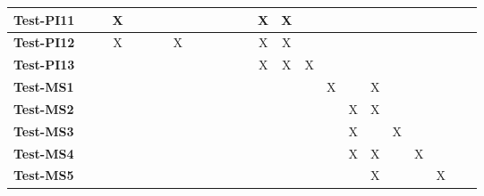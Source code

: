 \documentclass[12pt, titlepage]{article}
\begin{document}
\begin{landscape}
\begin{table}[H]
\begin{adjustwidth}{-0.1in}{-1in}
{\begin{tabular}{|c|c|c|c|c|c|c|c|c|c|c|c|c|c|c|c|c|c|c|c|c|c|c|c|}
\multicolumn{1}{|l|}{\textbf{Test-PI11}}   &             &              &X             &              &             &             &             &             &              &              &             &             &X              &X             &              &                & & & & & & &\\ \hline
\multicolumn{1}{|l|}{\textbf{Test-PI12}}   &             &              &X             &              &             &             &X             &             &              &              &             &             &X              &X             &              &                & & & & & & &\\ \hline
\multicolumn{1}{|l|}{\textbf{Test-PI13}}   &             &              &             &              &             &             &             &             &              &              &             &             &X              &X             &X              &                & & & & & & &\\ \hline
\multicolumn{1}{|l|}{\textbf{Test-MS1}}   &             &              &             &              &             &             &             &             &              &              &             &             &              &             &              &X                & &X & & & & &\\ \hline
\multicolumn{1}{|l|}{\textbf{Test-MS2}}   &             &              &             &              &             &             &             &             &              &              &             &             &              &             &              &                &X &X & & & & &\\ \hline
\multicolumn{1}{|l|}{\textbf{Test-MS3}}   &             &              &             &              &             &             &             &             &              &              &             &             &              &             &              &                &X & &X & & & &\\ \hline
\multicolumn{1}{|l|}{\textbf{Test-MS4}}   &             &              &             &              &             &             &             &             &              &              &             &             &              &             &              &                &X &X & &X & & &\\ \hline
\multicolumn{1}{|l|}{\textbf{Test-MS5}}  &             &              &             &              &             &             &             &             &              &              &             &             &              &             &              &                & &X & & &X & &\\ \hline

\end{tabular}}
\end{adjustwidth}
\end{table}
\end{landscape}
\end{document}
